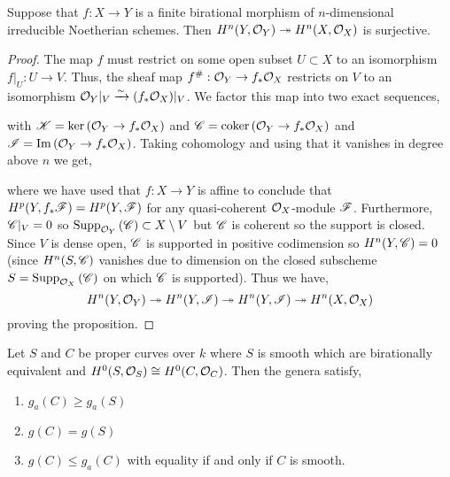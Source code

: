 \documentclass[12pt]{article}
\begin{document}
\begin{lemma}
Suppose that $f : X \to Y$ is a finite birational morphism of $n$-dimensional irreducible Noetherian schemes. Then $H^n(Y, \mathcal{O}_{Y}) \twoheadrightarrow H^n(X, \mathcal{O}_{X})$ is surjective.
\end{lemma}

\begin{proof}
The map $f$ must restrict on some open subset $U \subset X$ to an isomorphism $f|_U : U \to V$. Thus, the sheaf map $f^\# : \mathcal{O}_{Y} \to f_* \mathcal{O}_{X}$ restricts on $V$ to an isomorphism $\mathcal{O}_{Y}|_V \xrightarrow{\sim} (f_* \mathcal{O}_{X})|_V$. We factor this map into two exact sequences,
\begin{center}
\end{center}
with $\mathscr{K} = \ker{(\mathcal{O}_{Y} \to f_* \mathcal{O}_{X})}$ and $\mathscr{C} = \operatorname{\mathrm{coker}}{(\mathcal{O}_{Y} \to f_* \mathcal{O}_{X})}$ and $\mathscr{I} = \mathrm{Im}\left( \mathcal{O}_{Y} \to f_* \mathcal{O}_{X} \right)$. Taking cohomology and using that it vanishes in degree above $n$ we get,
\begin{center}
\end{center}
where we have used that $f : X \to Y$ is affine to conclude that $H^p(Y, f_* \mathscr{F}) = H^p(Y, \mathscr{F})$ for any quasi-coherent $\mathcal{O}_{X}$-module $\mathscr{F}$. Furthermore, $\mathscr{C}|_V = 0$ so $\mathrm{Supp}_{\mathcal{O}_{Y}}\left(\mathscr{C} \right) \subset X \setminus V$ but $\mathscr{C}$ is coherent so the support is closed. Since $V$ is dense open, $\mathscr{C}$ is supported in positive codimension so $H^n(Y, \mathscr{C}) = 0$ (since $H^n(S, \mathscr{C})$ vanishes due to dimension on the closed subscheme $S = \mathrm{Supp}_{\mathcal{O}_{X}}\left(\mathscr{C} \right)$ on which $\mathscr{C}$ is supported). Thus we have,
\[ H^n(Y, \mathcal{O}_{Y}) \twoheadrightarrow H^n(Y, \mathscr{I}) \twoheadrightarrow H^n(Y, \mathscr{I}) \twoheadrightarrow H^n(X, \mathcal{O}_{X}) \]
proving the proposition.
\end{proof}

\begin{cor}
Let $S$ and $C$ be proper curves over $k$ where $S$ is smooth which are birationally equivalent and $H^0(S, \mathcal{O}_{S}) \cong H^0(C, \mathcal{O}_{C})$. Then the genera satisfy,
\begin{enumerate}
\item $g_a(C) \ge g_a(S)$
\item $g(C) = g(S)$
\item $g(C) \le g_a(C)$ with equality if and only if $C$ is smooth.
\end{enumerate} 
\end{cor}
\end{document}
